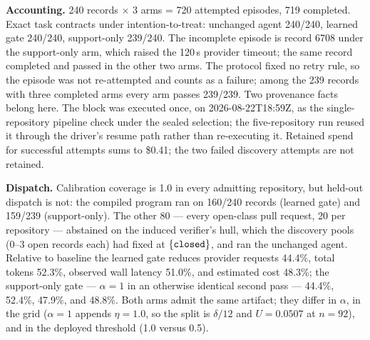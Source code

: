 \begin{table}[t]
  \centering
  \caption{Disaggregated outcomes for the gate-frontier study. Exact contracts
  are reported per arm under intention-to-treat; $^\dagger$ one support-only
  episode (record 6708) raised the 120\,s provider timeout and was not
  re-attempted, while the record passed in the other two arms. ``Dispatched''
  counts held-out records on which the compiled program ran; the remainder fell
  back to the unchanged agent on the guard clause .
  ``Coverage in sweep'' lists every calibration coverage the frozen grid
  produces for the learned gate. The support-only arm ($\alpha=1$) reproduces
  the same $n$ and $k$ at every $\eta$ but, because $\alpha=1$ appends
  $\eta=1.0$ to the grid, its Bonferroni split is $\delta/12$ ($U=0.0507$ at
  $n=92$) and it deploys threshold 1.0 rather than 0.5.}
  \label{tab:gate-frontier-disaggregated}
  \footnotesize
  \setlength{\tabcolsep}{3pt}
  
\end{table}

\textbf{Accounting.} 240 records $\times$ 3 arms = 720 attempted episodes, 719
completed. Exact task contracts under intention-to-treat: unchanged agent
240/240, learned gate 240/240, support-only 239/240. The incomplete episode is
 record 6708 under the support-only arm, which raised the
120\,s provider timeout; the same record completed and passed in the other two
arms. The protocol fixed no retry rule, so the episode was not re-attempted and
counts as a failure; among the 239 records with three completed arms every arm
passes 239/239. Two provenance facts belong here. The  block
was executed once, on 2026-08-22T18:59Z, as the single-repository pipeline
check under the sealed selection; the five-repository run reused it through the
driver's resume path rather than re-executing it. Retained spend for successful
attempts sums to \$0.41; the two failed  discovery
attempts are not retained.

\textbf{Dispatch.} Calibration coverage is 1.0 in every admitting repository,
but held-out dispatch is not: the compiled program ran on 160/240 records
(learned gate) and 159/239 (support-only). The other 80 --- every open-class
pull request, 20 per repository --- abstained on the induced verifier's
 hull, which the discovery pools (0--3 open records each) had
fixed at $\{\texttt{closed}\}$, and ran the unchanged agent. Relative to baseline
the learned gate reduces provider requests 44.4\%, total tokens 52.3\%,
observed wall latency 51.0\%, and estimated cost 48.3\%; the support-only gate
--- $\alpha=1$ in an otherwise identical second  pass ---
44.4\%, 52.4\%, 47.9\%, and 48.8\%. Both arms admit the same artifact; they
differ in $\alpha$, in the grid ($\alpha=1$ appends $\eta=1.0$, so the split is
$\delta/12$ and $U=0.0507$ at $n=92$), and in the deployed threshold (1.0
versus 0.5).

